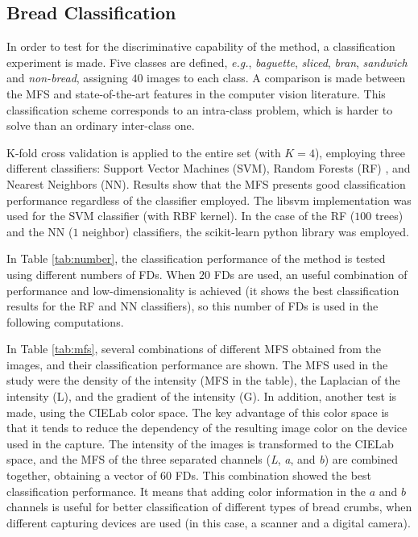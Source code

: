 

\subsection{Bread Classification}
\label{sec:10}

In order to test for the discriminative capability of the method, a classification experiment is made. Five classes are defined, {\em e.g.}, {\em baguette}, {\em sliced}, {\em bran}, {\em sandwich} and {\em non-bread}, assigning $40$ images to each class. A comparison is made between the MFS and state-of-the-art features in the computer vision literature. This classification scheme corresponds to an intra-class problem, which is harder to solve than an ordinary inter-class one. 

K-fold cross validation is applied to the entire set (with $K=4$), employing three different classifiers: Support Vector Machines (SVM), Random Forests (RF) \cite{Breiman2001}, and Nearest Neighbors (NN). Results show that the MFS presents good classification performance regardless of the classifier employed. The \textsf{libsvm} implementation \cite{Chang2011} was used for the SVM classifier (with RBF kernel). In the case of the RF ($100$ trees) and the NN ($1$ neighbor) classifiers, the \textsf{scikit-learn} python library was employed.

In Table \ref{tab:number}, the classification performance of the method is tested using different numbers of FDs. When $20$ FDs are used, an useful combination of performance and low-dimensionality is achieved (it shows the best classification results for the RF and NN classifiers), so this number of FDs is used in the following computations. 

In Table \ref{tab:mfs}, several combinations of different MFS obtained from the images, and their classification performance are shown. The MFS used in the study were the density of the intensity (MFS in the table), the Laplacian of the intensity (L), and the gradient of the intensity (G). In addition, another test is made, using the CIELab color space. The key advantage of this color space is that it tends to reduce the dependency of the resulting image color on the device used in the capture. The intensity of the images is transformed to the CIELab space, and the MFS of the three separated channels ({\em L}, {\em a}, and {\em b}) are combined together, obtaining a vector of $60$ FDs. This combination showed the best classification performance. It means that adding color information in the $a$ and $b$ channels is useful for better classification of different types of bread crumbs, when different capturing devices are used (in this case, a scanner and a digital camera).

